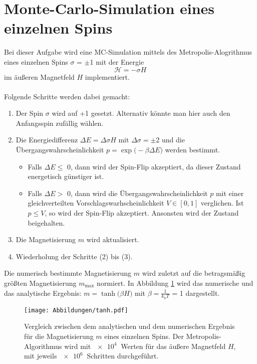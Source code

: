 



\maketitle

\section*{Monte-Carlo-Simulation eines einzelnen Spins}
Bei dieser Aufgabe wird eine MC-Simulation mittels des Metropolis-Alogrithmus
eines einzelnen Spins $\sigma$ = $\pm$1 mit der Energie
\begin{equation*}
  \mathcal{H}=-\sigma H
\end{equation*}
\noindent
im äußeren Magnetfeld $H$ implementiert.\\
\\
Folgende Schritte werden dabei gemacht:

\begin{enumerate}
  \item Der Spin $\sigma$ wird auf +1 gesetzt. Alternativ könnte man hier auch
  den Anfangsspin zufällig wählen.
  \item Die Energiedifferenz $\Delta E = \Delta\sigma H$ mit $\Delta\sigma = \pm$2
  und die Übergangswahrscheinlichkeit $p = \exp{\bigl(-\beta\Delta E\bigr)}$ werden bestimmt.
    \begin{itemize}
      \item Falls $\Delta E \leq$ 0, dann wird der Spin-Flip akzeptiert, da dieser
      Zustand energetisch günstiger ist.
      \item Falls $\Delta E >$ 0, dann wird die Übergangswahrscheinlichkeit $p$
      mit einer gleichverteilten Vorschlagswarhscheinlichkeit $V \in [0,1]$
      verglichen. Ist $p \leq V$, so wird der Spin-Flip akzeptiert. Ansonsten
      wird der Zustand beigehalten.
    \end{itemize}
  \item Die Magnetisierung $m$ wird aktualisiert.
  \item Wiederholung der Schritte (2) bis (3).
\end{enumerate}
\noindent
Die numerisch bestimmte Magnetisierung $m$ wird zuletzt auf die betragsmäßig
größten Magnetisierung $m_{\text{max}}$ normiert. In Abbildung \ref{fig:tanh}
wird das numerische und das analytische Ergebnis:
$m = \tanh{\bigl(\beta H \bigr)}$ mit
$\beta = \frac{1}{k_{\text{b}}T}$ = 1 dargestellt.

\begin{figure}[H]
    \centering
    \texttt{[image: Abbildungen/tanh.pdf]}
    \caption{Vergleich zwischen dem analytischen und dem numerischen Ergebnis für
    die Magnetisierung $m$ eines einzelnen Spins. Der Metropolis-Algorithmus
    wird mit $\SI{e4}{}$ Werten für das äußere Magnetfeld $H$, mit jeweils
    $\SI{e6}{}$ Schritten durchgeführt.}
    \label{fig:tanh}
\end{figure}



